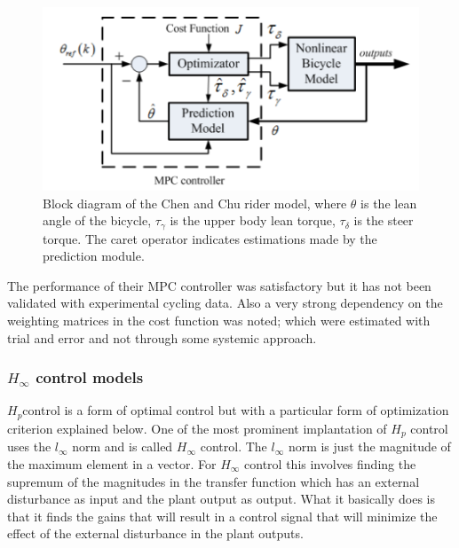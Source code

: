 \begin{figure}[ht]
    \centering
    \includegraphics[scale=0.45]{images/chen_mpc.png}
    \caption{Block diagram of the Chen and Chu rider model, where \ensuremath{\theta} is the lean angle of the bicycle, \ensuremath{\tau_\gamma} is the upper body lean torque, \ensuremath{\tau_\delta} is the steer torque. The caret operator  indicates estimations made by the prediction module.\cite{chu2018modelling} }
    \label{fig:figure12}
\end{figure}
\par
The performance of their MPC controller was satisfactory but it has not been validated with experimental cycling data. Also a very strong dependency on the weighting matrices in the cost function was noted; which were estimated with trial and error and not through some systemic approach.

\subsubsection{\ensuremath{H_\infty} control models}

\ensuremath{H_p}control is a form of optimal control but with a particular form of optimization criterion explained below. One of the  most prominent implantation of \ensuremath{H_p} control uses the \ensuremath{l_\infty} norm and is called \ensuremath{H_\infty} control. The \ensuremath{l_\infty} norm is just the magnitude of the maximum element in a vector. For \ensuremath{H_\infty} control this involves finding  the supremum of the magnitudes  in the transfer function which has an external disturbance as input and the plant output as output. What it basically does is that it finds the gains that will result in a control signal that will minimize the effect of the external disturbance in the plant outputs.

